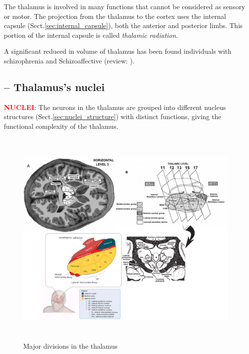 The thalamus is involved in many functions that cannot be considered as sensory
or motor. The projection from the thalamus to the cortex uses the internal
capsule (Sect.\ref{sec:internal_capsule}), both the anterior and posterior limbs. This
portion of the internal capsule is called {\it thalamic radiation}.

A significant reduced in volume of thalamus has been found  individuals with
schizophrenia and Schizoaffective (review: \citep{smith2011}).

\subsection{-- Thalamus's nuclei}

\textcolor{red}{\bf NUCLEI}: The neurons in the thalamus are grouped into
different nucleus structures (Sect.\ref{sec:nuclei_structure}) with distinct
functions, giving the functional complexity of the thalamus. 

\begin{figure}[htb]
\centerline{\includegraphics[height=11cm]{./images/thalamus.eps}}
\caption{Major divisions in the thalamus}\label{fig:thalamus}
\end{figure} 

